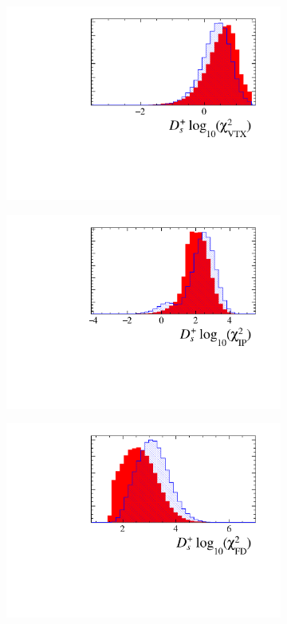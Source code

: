\begin{figure}[!h]
\begin{subfigure}[t]{0.22\textwidth}
      \includegraphics[width=1.0\textwidth]{figs/Selection/Ds_BDT_Var_Ds2KKPi_log10_D_ENDVERTEX_CHI2.pdf}
   \end{subfigure}
   \begin{subfigure}[t]{0.22\textwidth}
      \centering
      \includegraphics[width=1.0\textwidth]{figs/Selection/Ds_BDT_Var_Ds2KKPi_log10_D_IPCHI2_OWNPV.pdf}
   \end{subfigure}
   \begin{subfigure}[t]{0.22\textwidth}
      \centering
      \includegraphics[width=1.0\textwidth]{figs/Selection/Ds_BDT_Var_Ds2KKPi_log10_D_FDCHI2_OWNPV.pdf}

\end{subfigure}
\end{figure}
